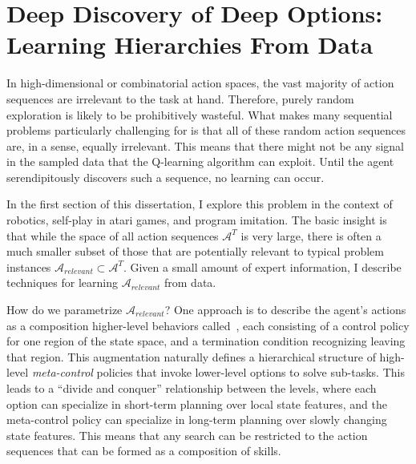 \chapter{Deep Discovery of Deep Options: Learning Hierarchies From Data}
\setcounter{secnumdepth}{1}
In high-dimensional or combinatorial action spaces, the vast majority of action sequences are irrelevant to the task at hand.
Therefore, purely random exploration is likely to be prohibitively wasteful.
What makes many sequential problems particularly challenging for is that all of these random action sequences are, in a sense, equally irrelevant. 
This means that there might not be any signal in the sampled data that the Q-learning algorithm can exploit.
Until the agent serendipitously discovers such a sequence, no learning can occur.

In the first section of this dissertation, I explore this problem in the context of robotics, self-play in atari games, and program imitation. 
The basic insight is that while the space of all action sequences $\mathcal{A}^T$ is very large, there is often a much smaller subset of those that are potentially relevant to typical problem instances $\mathcal{A}_{relevant} \subset \mathcal{A}^T$. 
Given a small amount of expert information, I describe techniques for learning $\mathcal{A}_{relevant}$ from data.

How do we parametrize $\mathcal{A}_{relevant}$?
One approach is to describe the agent's actions as a composition higher-level behaviors called~\cite{suttonPS99}, each consisting of a control policy for one region of the state space, and a termination condition recognizing leaving that region. This augmentation naturally defines a hierarchical structure of high-level \emph{meta-control} policies that invoke lower-level options to solve sub-tasks.
This leads to a ``divide and conquer'' relationship between the levels, where each option can specialize in short-term planning over local state features, and the meta-control policy can specialize in long-term planning over slowly changing state features.
This means that any search can be restricted to the action sequences that can be formed as a composition of skills.

